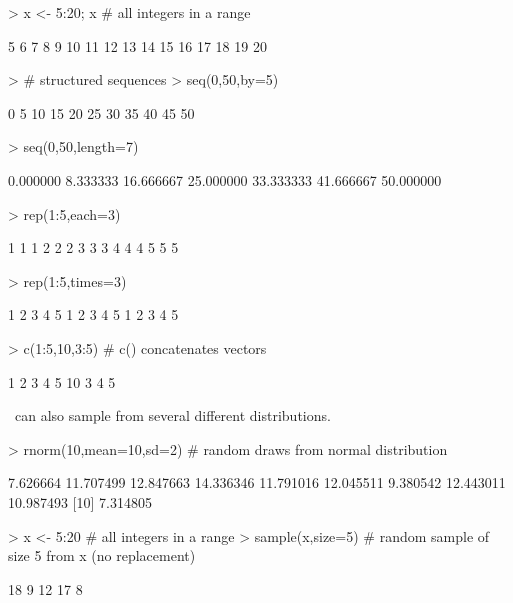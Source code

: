 \begin{Schunk}
\begin{Sinput}
> x <- 5:20; x                 # all integers in a range
\end{Sinput}
\begin{Soutput}
 [1]  5  6  7  8  9 10 11 12 13 14 15 16 17 18 19 20
\end{Soutput}
\begin{Sinput}
> # structured sequences
> seq(0,50,by=5)               
\end{Sinput}
\begin{Soutput}
 [1]  0  5 10 15 20 25 30 35 40 45 50
\end{Soutput}
\begin{Sinput}
> seq(0,50,length=7)               
\end{Sinput}
\begin{Soutput}
[1]  0.000000  8.333333 16.666667 25.000000 33.333333 41.666667 50.000000
\end{Soutput}
\begin{Sinput}
> rep(1:5,each=3)
\end{Sinput}
\begin{Soutput}
 [1] 1 1 1 2 2 2 3 3 3 4 4 4 5 5 5
\end{Soutput}
\begin{Sinput}
> rep(1:5,times=3)
\end{Sinput}
\begin{Soutput}
 [1] 1 2 3 4 5 1 2 3 4 5 1 2 3 4 5
\end{Soutput}
\begin{Sinput}
> c(1:5,10,3:5)                # c() concatenates vectors
\end{Sinput}
\begin{Soutput}
[1]  1  2  3  4  5 10  3  4  5
\end{Soutput}
\end{Schunk}

\R\ can also sample from several different distributions.

\begin{Schunk}
\begin{Sinput}
> rnorm(10,mean=10,sd=2)    # random draws from normal distribution
\end{Sinput}
\begin{Soutput}
 [1]  7.626664 11.707499 12.847663 14.336346 11.791016 12.045511  9.380542 12.443011 10.987493
[10]  7.314805
\end{Soutput}
\begin{Sinput}
> x <- 5:20                 # all integers in a range
> sample(x,size=5)          # random sample of size 5 from x (no replacement)
\end{Sinput}
\begin{Soutput}
[1] 18  9 12 17  8
\end{Soutput}
\end{Schunk}

